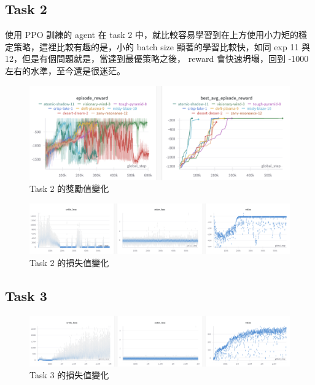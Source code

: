 \clearpage
\subsection{Task 2}


使用 PPO 訓練的 agent 在 task 2 中，就比較容易學習到在上方使用小力矩的穩定策略，這裡比較有趣的是，小的 batch size 顯著的學習比較快，如同 exp 11 與 12，但是有個問題就是，當達到最優策略之後， reward 會快速坍塌，回到 -1000 左右的水準，至今還是很迷茫。

\begin{figure}[h]
    \centering
    \includegraphics[width=\textwidth]{figures/task2_reward.png}
    \caption{Task 2 的獎勵值變化}
    \label{fig:task2_reward}
\end{figure}

\begin{figure}[h]
    \centering
    \includegraphics[width=\textwidth]{figures/task2_loss.png}
    \caption{Task 2 的損失值變化}
    \label{fig:task2_loss}
\end{figure}

\clearpage
\subsection{Task 3}

\begin{figure}[h]
    \centering
    \includegraphics[width=\textwidth]{figures/task3_loss.png}
    \caption{Task 3 的損失值變化}
    \label{fig:task3_loss}
\end{figure}

